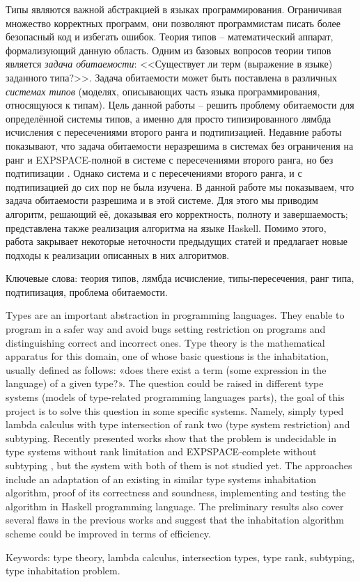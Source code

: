\documentclass[../main.tex]{subfiles}
\begin{document}
Типы являются важной абстракцией в языках программирования. Ограничивая множество корректных программ, они позволяют программистам писать более безопасный код и избегать ошибок. Теория типов -- математический аппарат, формализующий данную область. Одним из базовых вопросов теории типов является {\it задача обитаемости}: <<Существует ли терм (выражение в языке) заданного типа?>>. Задача обитаемости может быть поставлена в различных {\it системах типов} (моделях, описывающих часть языка программирования, относящуюся к типам). Цель данной работы -- решить проблему обитаемости для определённой системы типов, а именно для просто типизированного лямбда исчисления с пересечениями второго ранга и подтипизацией. Недавние работы показывают, что задача обитаемости неразрешима в системах без ограничения на ранг \cite{urzyczyn_1997} и EXPSPACE-полной в системе с пересечениями второго ранга, но без подтипизации \cite{kusmierek_2007, urzyczyn_2009}. Однако система и с пересечениями второго ранга, и с подтипизацией до сих пор не была изучена. В данной работе мы показываем, что задача обитаемости разрешима и в этой системе. Для этого мы приводим алгоритм, решающий её, доказывая его корректность, полноту и завершаемость; представлена также реализация алгоритма на языке Haskell. Помимо этого, работа закрывает некоторые неточности предыдущих статей и предлагает новые подходы к реализации описанных в них алгоритмов.

\vspace*{\fill}

Ключевые слова: теория типов, лямбда исчисление, типы-пересечения, ранг типа, подтипизация, проблема обитаемости.


\newpage

Types are an important abstraction in programming languages. They enable to program in a safer way and avoid bugs setting restriction on programs and distinguishing correct and incorrect ones. Type theory is the mathematical apparatus for this domain, one of whose basic questions is the inhabitation, usually defined as follows: «does there exist a term (some expression in the language) of a given type?». The question could be raised in different type systems (models of type-related programming languages parts), the goal of this project is to solve this question in some specific systems. Namely, simply typed lambda calculus with type intersection of rank two (type system restriction) and subtyping. Recently presented works show that the problem is undecidable in type systems without rank limitation \cite{urzyczyn_1997} and EXPSPACE-complete without subtyping \cite{kusmierek_2007, urzyczyn_2009}, but the system with both of them is not studied yet. The approaches include an adaptation of an existing in similar type systems inhabitation algorithm, proof of its correctness and soundness, implementing and testing the algorithm in Haskell programming language. The preliminary results also cover several flaws in the previous works and suggest that the inhabitation algorithm scheme could be improved in terms of efficiency.

\vspace*{\fill}

Keywords: type theory, lambda calculus, intersection types, type rank, subtyping, type inhabitation problem.
\end{document}
